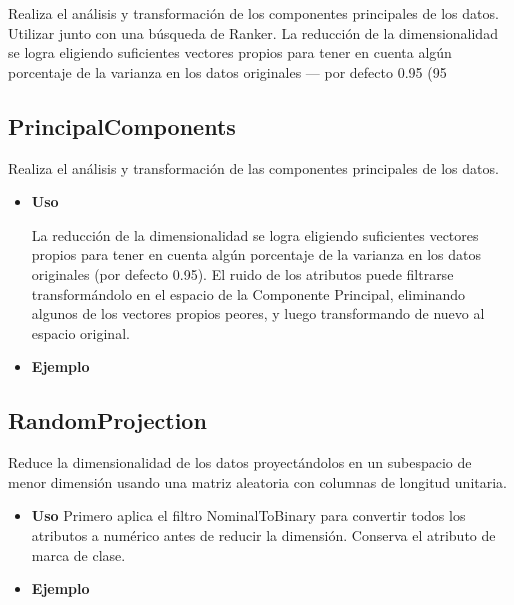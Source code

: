 Realiza el análisis y transformación de los componentes principales de los datos. Utilizar junto con una búsqueda de Ranker. La reducción de la dimensionalidad se logra eligiendo suficientes vectores propios para tener en cuenta algún porcentaje de la varianza en los datos originales --- por defecto 0.95 (95%

	\subsection{PrincipalComponents}
	\begin{justify}
		Realiza el análisis y transformación de las componentes principales de los datos.
	\end{justify}
	\begin{itemize}
		\item \textbf{Uso}

	\begin{justify}
		La reducción de la dimensionalidad se logra eligiendo suficientes vectores propios para tener en cuenta algún porcentaje de la varianza en los datos originales (por defecto 0.95). El ruido de los atributos puede filtrarse transformándolo en el espacio de la Componente Principal, eliminando algunos de los vectores propios peores, y luego transformando de nuevo al espacio original.
	\end{justify}
		\item \textbf{Ejemplo}
	\end{itemize}

	\subsection{RandomProjection}
	\begin{justify}
		Reduce la dimensionalidad de los datos proyectándolos en un subespacio de menor dimensión usando una matriz aleatoria con columnas de longitud unitaria.
	\end{justify}
	\begin{itemize}
		\item \textbf{Uso}
		Primero aplica el filtro NominalToBinary para convertir todos los atributos a numérico antes de reducir la dimensión. Conserva el atributo de marca de clase.
	\begin{justify}
		
	\end{justify}
		\item \textbf{Ejemplo}		
	\end{itemize}

